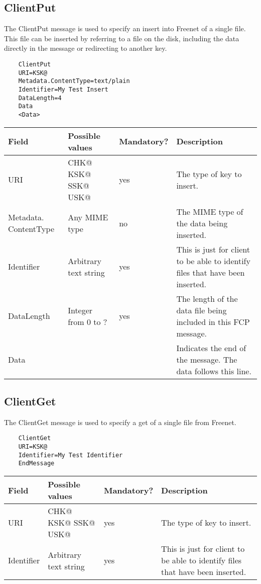 \subsection{ClientPut}
The ClientPut message is used to specify an insert into Freenet of a single file. This file can be inserted by referring to a file on the disk, including the data directly in the message or redirecting to another key.
\begin{verbatim}
    ClientPut
    URI=KSK@
    Metadata.ContentType=text/plain
    Identifier=My Test Insert
    DataLength=4
    Data
    <Data>
\end{verbatim}
\begin{tabularx}{\textwidth}{p{3cm}|p{2cm}|p{2.5cm}|p{5.5cm}}
\toprule
    Field & Possible values & Mandatory? & Description \\
\midrule 
URI & CHK@ KSK@ SSK@ USK@ & yes & The type of key to insert. \\
\addlinespace
\hline
\addlinespace
Metadata. ContentType & Any MIME type & no & The MIME type of the data being inserted. \\
\addlinespace
\hline
\addlinespace
Identifier & Arbitrary text string & yes & This is just for client to be able to identify files that have been inserted. \\
\addlinespace
\hline
\addlinespace
DataLength & Integer from 0 to ? & yes & The length of the data file being included in this FCP message. \\
\addlinespace
\hline
\addlinespace
Data &  &  & Indicates the end of the message. The data follows this line. \\
\bottomrule
\end{tabularx}
\newpage
\subsection{ClientGet}
The ClientGet message is used to specify a get of a single file from Freenet.
\begin{verbatim}
    ClientGet
    URI=KSK@
    Identifier=My Test Identifier
    EndMessage
\end{verbatim}
\begin{tabularx}{\textwidth}{p{3cm}|p{2cm}|p{2.5cm}|p{5.5cm}}
\toprule
    Field & Possible values & Mandatory? & Description \\
\midrule 
URI & CHK@ KSK@ SSK@ USK@ & yes & The type of key to insert. \\
\addlinespace
\hline
\addlinespace
Identifier & Arbitrary text string & yes & This is just for client to be able to identify files that have been inserted. \\
\bottomrule
\end{tabularx}
\newpage
